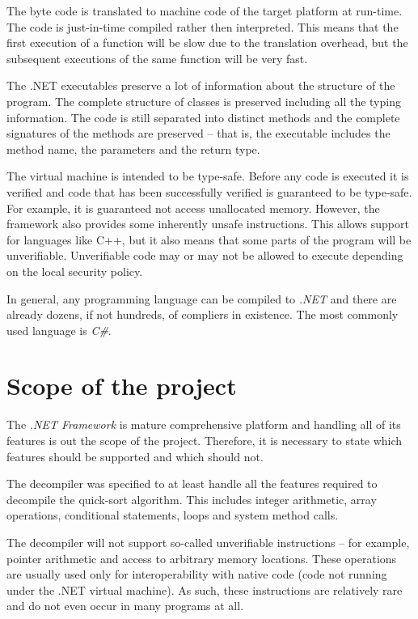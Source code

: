 \documentclass[12pt,twoside,notitlepage]{report}
\begin{document}
The byte code is translated to machine code of the 
target platform at run-time.  The code is just-in-time compiled rather then
interpreted.  This means that the first execution of a function will be slow
due to the translation overhead, but the subsequent executions of the
same function will be very fast.

The .NET executables preserve a lot of information about the
structure of the program.  The complete structure of classes is
preserved including all the typing information.  The code is still
separated into distinct methods and the complete signatures of 
the methods are preserved -- that is, the executable includes
the method name, the parameters and the return type.

The virtual machine is intended to be type-safe. Before any code
is executed it is verified and code that has been successfully
verified is guaranteed to be type-safe.  For example, it is 
guaranteed not access unallocated memory.
However, the framework also provides some inherently unsafe
instructions.  This allows support for languages like C++, but
it also means that some parts of the program will be unverifiable.
Unverifiable code may or may not be allowed to execute depending
on the local security policy.

In general, any programming language can be compiled to \emph{.NET} and 
there are already dozens, if not hundreds, of compliers in existence.
The most commonly used language is \emph{C\#}.


\section{Scope of the project}

The \emph{.NET Framework} is mature comprehensive platform and handling
all of its features is out the scope of the project.  Therefore, it is
necessary to state which features should be supported and which
should not.

The decompiler was specified to at least handle all the features required
to decompile the quick-sort algorithm.  This includes integer arithmetic,
array operations, conditional statements, loops and system method calls.

The decompiler will not support so-called unverifiable instructions -- 
for example, pointer arithmetic and access to arbitrary memory locations.
These operations are usually used only for
interoperability with native code (code not running under the .NET 
virtual machine).  As such, these instructions
are relatively rare and do not even occur in many programs at all.
\end{document}
